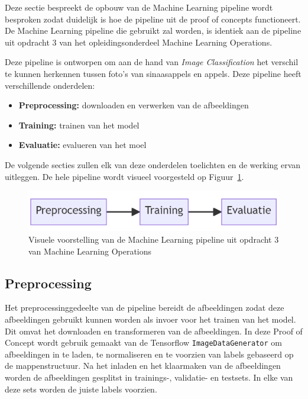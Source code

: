 Deze sectie bespreekt de opbouw van de Machine Learning pipeline wordt besproken zodat duidelijk is hoe de pipeline uit de proof of concepts functioneert. De Machine Learning pipeline die gebruikt zal worden, is identiek aan de pipeline uit opdracht 3 van het opleidingsonderdeel Machine Learning Operations.

Deze pipeline is ontworpen om aan de hand van \textit{Image Classification} het verschil te kunnen herkennen tussen foto's van sinaasappels en appels. Deze pipeline heeft verschillende onderdelen:

\begin{itemize}
    \item \textbf{Preprocessing:} downloaden en verwerken van de afbeeldingen
    \item \textbf{Training:} trainen van het model
    \item \textbf{Evaluatie:} evalueren van het moel
\end{itemize}

De volgende secties zullen elk van deze onderdelen toelichten en de werking ervan uitleggen. De hele pipeline wordt visueel voorgesteld op Figuur~\ref{fig:Model_Flow}.

\begin{figure}
    \centering
    \includegraphics[width=0.9\linewidth]{graphics/Model_Diagram.PNG}
    \caption[Visuele voorstelling pipeline PoC]{Visuele voorstelling van de Machine Learning pipeline uit opdracht 3 van Machine Learning Operations}
    \label{fig:Model_Flow}
\end{figure}


\subsection{Preprocessing}

Het preprocessinggedeelte van de pipeline bereidt de afbeeldingen  zodat deze afbeeldingen gebruikt kunnen worden als invoer voor het trainen van het model. Dit omvat het downloaden en transformeren van de afbeeldingen. In deze Proof of Concept wordt gebruik gemaakt van de Tensorflow \texttt{ImageDataGenerator} om afbeeldingen in te laden, te normaliseren en te voorzien van labels gebaseerd op de mappenstructuur. Na het inladen en het klaarmaken van de afbeeldingen worden de afbeeldingen gesplitst in trainings-, validatie- en testsets. In elke van deze sets worden de juiste labels voorzien.

